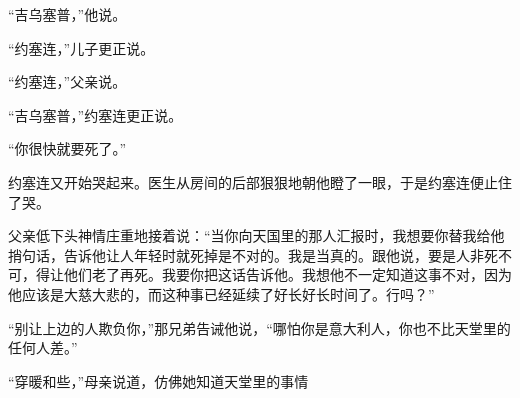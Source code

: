     “吉乌塞普，”他说。

    “约塞连，”儿子更正说。

    “约塞连，”父亲说。

    “吉乌塞普，”约塞连更正说。

    “你很快就要死了。”

    约塞连又开始哭起来。医生从房间的后部狠狠地朝他瞪了一眼，于是约塞连便止住了哭。

    父亲低下头神情庄重地接着说：“当你向天国里的那人汇报时，我想要你替我给他捎句话，告诉他让人年轻时就死掉是不对的。我是当真的。跟他说，要是人非死不可，得让他们老了再死。我要你把这话告诉他。我想他不一定知道这事不对，因为他应该是大慈大悲的，而这种事已经延续了好长好长时间了。行吗？”

    “别让上边的人欺负你，”那兄弟告诫他说，“哪怕你是意大利人，你也不比天堂里的任何人差。”

    “穿暖和些，”母亲说道，仿佛她知道天堂里的事情
